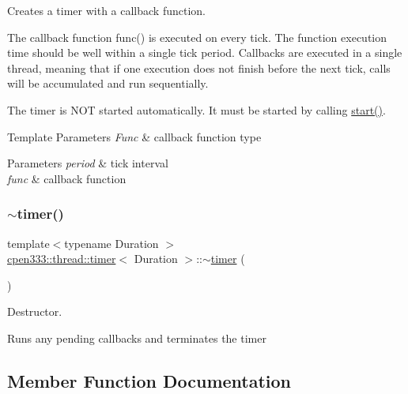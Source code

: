 Creates a timer with a callback function. 

The callback function func() is executed on every tick. The function execution time should be well within a single tick period. Callbacks are executed in a single thread, meaning that if one execution does not finish before the next tick, calls will be accumulated and run sequentially.

The timer is N\+OT started automatically. It must be started by calling \hyperlink{classcpen333_1_1thread_1_1timer_a0d1be90402f46912966ec5fc13707bce}{start()}.


\begin{DoxyTemplParams}{Template Parameters}
{\em Func} & callback function type \\
\hline
\end{DoxyTemplParams}

\begin{DoxyParams}{Parameters}
{\em period} & tick interval \\
\hline
{\em func} & callback function \\
\hline
\end{DoxyParams}
\mbox{\label{classcpen333_1_1thread_1_1timer_a4c25e491b57438c7a60fe54b45b369b8}} 
\subsubsection{\texorpdfstring{$\sim$timer()}{~timer()}}
{\footnotesize\ttfamily template$<$typename Duration $>$ \\
\hyperlink{classcpen333_1_1thread_1_1timer}{cpen333\+::thread\+::timer}$<$ Duration $>$\+::$\sim$\hyperlink{classcpen333_1_1thread_1_1timer}{timer} (\begin{DoxyParamCaption}{ }\end{DoxyParamCaption})\hspace{0.3cm}{\ttfamily [inline]}}



Destructor. 

Runs any pending callbacks and terminates the timer 

\subsection{Member Function Documentation}
\mbox{\label{classcpen333_1_1thread_1_1timer_a339ef2ea452a86d83a0f41c7d4e255b0}} 
